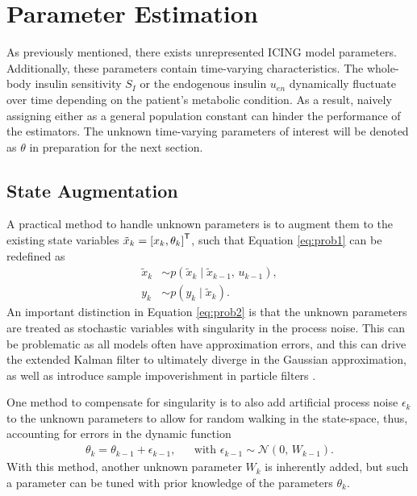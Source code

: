 \documentclass[nomenclature, english, bibtex]{kththesis}
\begin{document}
\section{Parameter Estimation}
As previously mentioned, there exists unrepresented \gls{ICING} model parameters. Additionally, these parameters contain time-varying characteristics. The whole-body insulin sensitivity $S_I$ or the endogenous insulin $u_{en}$ dynamically fluctuate over time depending on the patient's metabolic condition. As a result, naively assigning either as a general population constant can hinder the performance of the estimators. The unknown time-varying parameters of interest will be denoted as $\theta$ in preparation for the next section. 

\subsection{State Augmentation}\label{sec:augment}
A practical method to handle unknown parameters is to augment them to the existing state variables $\tilde{x}_k = \left[x_k, \theta_k\right]^{\sf T}$, such that Equation \eqref{eq:prob1} can be redefined as
\begin{equation} \label{eq:prob2}
\begin{aligned}
\tilde{x}_k &\sim p(\tilde{x}_{k} \mid \tilde{x}_{k-1},\,u_{k-1}),\\
y_{k} &\sim p(y_{k} \mid \tilde{x}_k).
\end{aligned}
\end{equation}
An important distinction in Equation \eqref{eq:prob2} is that the unknown parameters are treated as stochastic variables with singularity in the process noise. This can be problematic as all models often have approximation errors, and this can drive the extended Kalman filter to ultimately diverge in the Gaussian approximation, as well as introduce sample impoverishment in particle filters \cite{sarkka_bayesian_nodate}.

One method to compensate for singularity is to also add artificial process noise $\epsilon_{k}$ to the unknown parameters to allow for random walking in the state-space, thus, accounting for errors in the dynamic function
\begin{align}
\theta_k = \theta_{k-1} + \epsilon_{k-1}, && \text{with } \epsilon_{k-1} \sim \mathcal{N}(0,\,W_{k-1}).
\end{align}
With this method, another unknown parameter $W_{k}$ is inherently added, but such a parameter can be tuned with prior knowledge of the parameters $\theta_k$.
\end{document}
